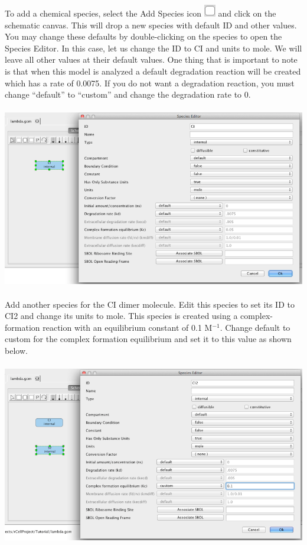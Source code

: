 \documentclass[titlepage,11pt]{article}
\begin{document}
To add a chemical species, select the Add Species icon \includegraphics{../gui/icons/modelview/add_species_selected} and click on the schematic canvas.  This will drop a new species with default ID and other values.  You may change these defaults by double-clicking on the species to open the Species Editor.  In this case, let us change the ID to CI and units to mole.  We will leave all other values at their default values.  One thing that is important to note is that when this model is analyzed a default degradation reaction will be created which has a rate of 0.0075.  If you do not want a degradation reaction, you must change ``default'' to ``custom'' and change the degradation rate to 0.

\begin{center}
\includegraphics[height=80mm]{screenshots/species}
\end{center}

Add another species for the CI dimer molecule.  Edit this species to set its ID to CI2 and change its units to mole.  This species is created using a complex-formation reaction with an equilibrium constant of 0.1 M$^{-1}$.  Change default to custom for the complex formation equilibrium and set it to this value as shown below.

\begin{center}
\includegraphics[height=80mm]{screenshots/species2} 
\end{center}
\end{document}

